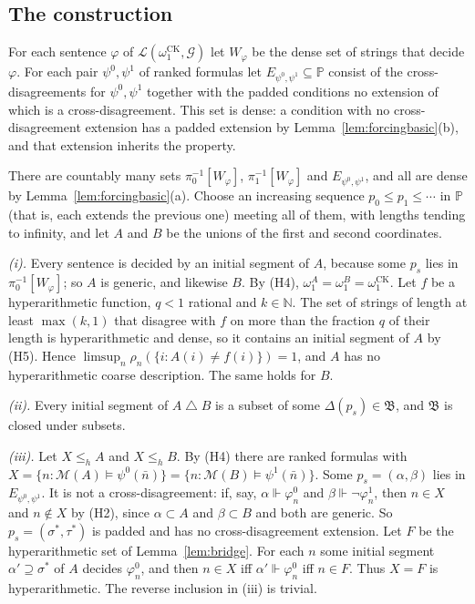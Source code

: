 \documentclass[11pt,letterpaper]{article}
\theoremstyle{definition}
\numberwithin{equation}{section}
\newcommand{\N}{\mathbb N}
\newcommand{\sd}{\mathbin{\triangle}}
\newcommand{\bud}{\mathfrak B}
\newcommand{\leh}{\le_{h}}
\newcommand{\omck}{\omega_1^{\mathrm{CK}}}
\newcommand{\forces}{\Vdash}
\newcommand{\PP}{\mathbb P}
\begin{document}
\subsection{The construction}
For each sentence $\varphi$ of $\mathcal L(\omck,\mathcal G)$ let $W_\varphi$ be the dense set of strings that decide $\varphi$. For each pair $\psi^0,\psi^1$ of ranked formulas let $E_{\psi^0,\psi^1}\subseteq\PP$ consist of the cross-disagreements for $\psi^0,\psi^1$ together with the padded conditions no extension of which is a cross-disagreement. This set is dense: a condition with no cross-disagreement extension has a padded extension by Lemma~\ref{lem:forcingbasic}(b), and that extension inherits the property.

There are countably many sets $\pi_0^{-1}[W_\varphi]$, $\pi_1^{-1}[W_\varphi]$ and $E_{\psi^0,\psi^1}$, and all are dense by Lemma~\ref{lem:forcingbasic}(a). Choose an increasing sequence $p_0\le p_1\le\cdots$ in $\PP$ (that is, each extends the previous one) meeting all of them, with lengths tending to infinity, and let $A$ and $B$ be the unions of the first and second coordinates.

\emph{\textup{(i)}.} Every sentence is decided by an initial segment of $A$, because some $p_s$ lies in $\pi_0^{-1}[W_\varphi]$; so $A$ is generic, and likewise $B$. By (H4), $\omega_1^A=\omega_1^B=\omck$. Let $f$ be a hyperarithmetic function, $q<1$ rational and $k\in\N$. The set of strings of length at least $\max(k,1)$ that disagree with $f$ on more than the fraction $q$ of their length is hyperarithmetic and dense, so it contains an initial segment of $A$ by (H5). Hence $\limsup_n\rho_n(\{i:A(i)\ne f(i)\})=1$, and $A$ has no hyperarithmetic coarse description. The same holds for $B$.

\emph{\textup{(ii)}.} Every initial segment of $A\sd B$ is a subset of some $\Delta(p_s)\in\bud$, and $\bud$ is closed under subsets.

\emph{\textup{(iii)}.} Let $X\leh A$ and $X\leh B$. By (H4) there are ranked formulas with $X=\{n:\mathcal M(A)\models\psi^0(\bar n)\}=\{n:\mathcal M(B)\models\psi^1(\bar n)\}$. Some $p_s=(\alpha,\beta)$ lies in $E_{\psi^0,\psi^1}$. It is not a cross-disagreement: if, say, $\alpha\forces\varphi^0_n$ and $\beta\forces\neg\varphi^1_n$, then $n\in X$ and $n\notin X$ by (H2), since $\alpha\subset A$ and $\beta\subset B$ and both are generic. So $p_s=(\sigma^*,\tau^*)$ is padded and has no cross-disagreement extension. Let $F$ be the hyperarithmetic set of Lemma~\ref{lem:bridge}. For each $n$ some initial segment $\alpha'\supseteq\sigma^*$ of $A$ decides $\varphi^0_n$, and then $n\in X$ iff $\alpha'\forces\varphi^0_n$ iff $n\in F$. Thus $X=F$ is hyperarithmetic. The reverse inclusion in (iii) is trivial.
\end{document}
